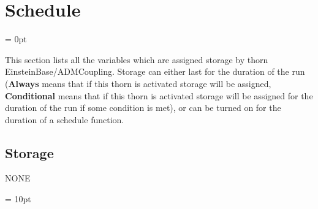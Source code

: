 
\section{Schedule} 


\parskip = 0pt


\noindent This section lists all the variables which are assigned storage by thorn EinsteinBase/ADMCoupling.  Storage can either last for the duration of the run ({\bf Always} means that if this thorn is activated storage will be assigned, {\bf Conditional} means that if this thorn is activated storage will be assigned for the duration of the run if some condition is met), or can be turned on for the duration of a schedule function.


\subsection*{Storage}NONE

\vspace{5mm}\parskip = 10pt 
